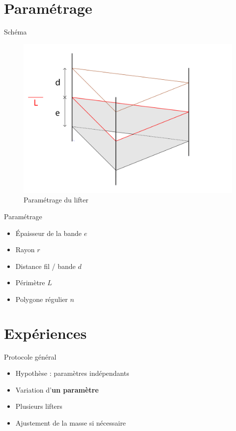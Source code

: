 \documentclass{beamer}
\begin{document}
	\section{Paramétrage}

		\begin{frame}{Schéma}
			\begin{figure}
				\center
				\includegraphics[scale=0.6]{img/lifter.png}
				\caption{Paramétrage du lifter}
			\end{figure}
		\end{frame}
	
		\begin{frame}{Paramétrage}
			\begin{itemize}
				\item Épaisseur de la bande $e$
				\item Rayon $r$
				\item Distance fil / bande $d$
				\item Périmètre $L$
				\item Polygone régulier $n$
			\end{itemize}
		\end{frame}
	
	\section{Expériences}
		\begin{frame}{Protocole général}
			\begin{itemize}
				\item Hypothèse : paramètres indépendants
				\item Variation d'\textbf{un paramètre}
				\item Plusieurs lifters
				\item Ajustement de la masse si nécessaire
			\end{itemize}
		\end{frame}
	
\end{document}
